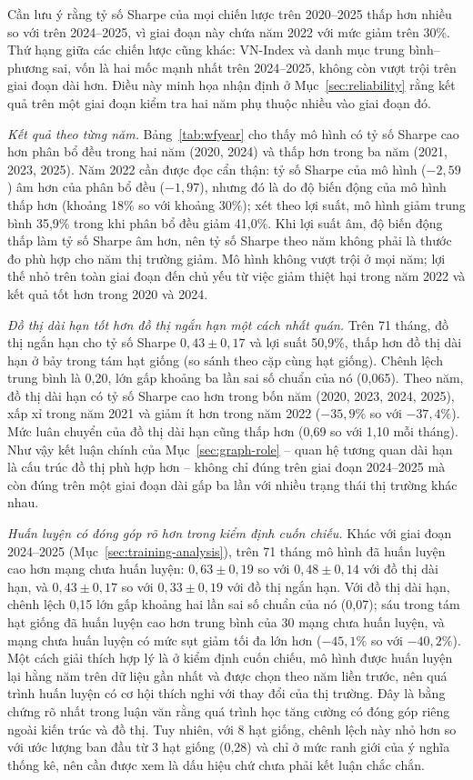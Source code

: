 Cần lưu ý rằng tỷ số Sharpe của mọi chiến lược trên 2020--2025 thấp hơn nhiều so với trên 2024--2025, vì giai đoạn này chứa năm 2022 với mức giảm trên 30\%. Thứ hạng giữa các chiến lược cũng khác: VN-Index và danh mục trung bình--phương sai, vốn là hai mốc mạnh nhất trên 2024--2025, không còn vượt trội trên giai đoạn dài hơn. Điều này minh họa nhận định ở Mục~\ref{sec:reliability} rằng kết quả trên một giai đoạn kiểm tra hai năm phụ thuộc nhiều vào giai đoạn đó.

\textit{Kết quả theo từng năm.} Bảng~\ref{tab:wfyear} cho thấy mô hình có tỷ số Sharpe cao hơn phân bổ đều trong hai năm (2020, 2024) và thấp hơn trong ba năm (2021, 2023, 2025). Năm 2022 cần được đọc cẩn thận: tỷ số Sharpe của mô hình ($-2{,}59$) âm hơn của phân bổ đều ($-1{,}97$), nhưng đó là do độ biến động của mô hình thấp hơn (khoảng 18\% so với khoảng 30\%); xét theo lợi suất, mô hình giảm trung bình 35,9\% trong khi phân bổ đều giảm 41,0\%. Khi lợi suất âm, độ biến động thấp làm tỷ số Sharpe âm hơn, nên tỷ số Sharpe theo năm không phải là thước đo phù hợp cho năm thị trường giảm. Mô hình không vượt trội ở mọi năm; lợi thế nhỏ trên toàn giai đoạn đến chủ yếu từ việc giảm thiệt hại trong năm 2022 và kết quả tốt hơn trong 2020 và 2024.

\textit{Đồ thị dài hạn tốt hơn đồ thị ngắn hạn một cách nhất quán.} Trên 71 tháng, đồ thị ngắn hạn cho tỷ số Sharpe $0{,}43\pm0{,}17$ và lợi suất 50,9\%, thấp hơn đồ thị dài hạn ở bảy trong tám hạt giống (so sánh theo cặp cùng hạt giống). Chênh lệch trung bình là 0,20, lớn gấp khoảng ba lần sai số chuẩn của nó (0,065). Theo năm, đồ thị dài hạn có tỷ số Sharpe cao hơn trong bốn năm (2020, 2023, 2024, 2025), xấp xỉ trong năm 2021 và giảm ít hơn trong năm 2022 ($-35{,}9\%$ so với $-37{,}4\%$). Mức luân chuyển của đồ thị dài hạn cũng thấp hơn (0,69 so với 1,10 mỗi tháng). Như vậy kết luận chính của Mục~\ref{sec:graph-role} -- quan hệ tương quan dài hạn là cấu trúc đồ thị phù hợp hơn -- không chỉ đúng trên giai đoạn 2024--2025 mà còn đúng trên một giai đoạn dài gấp ba lần với nhiều trạng thái thị trường khác nhau.

\textit{Huấn luyện có đóng góp rõ hơn trong kiểm định cuốn chiếu.} Khác với giai đoạn 2024--2025 (Mục~\ref{sec:training-analysis}), trên 71 tháng mô hình đã huấn luyện cao hơn mạng chưa huấn luyện: $0{,}63\pm0{,}19$ so với $0{,}48\pm0{,}14$ với đồ thị dài hạn, và $0{,}43\pm0{,}17$ so với $0{,}33\pm0{,}19$ với đồ thị ngắn hạn. Với đồ thị dài hạn, chênh lệch 0,15 lớn gấp khoảng hai lần sai số chuẩn của nó (0,07); sáu trong tám hạt giống đã huấn luyện cao hơn trung bình của 30 mạng chưa huấn luyện, và mạng chưa huấn luyện có mức sụt giảm tối đa lớn hơn ($-45{,}1\%$ so với $-40{,}2\%$). Một cách giải thích hợp lý là ở kiểm định cuốn chiếu, mô hình được huấn luyện lại hằng năm trên dữ liệu gần nhất và được chọn theo năm liền trước, nên quá trình huấn luyện có cơ hội thích nghi với thay đổi của thị trường. Đây là bằng chứng rõ nhất trong luận văn rằng quá trình học tăng cường có đóng góp riêng ngoài kiến trúc và đồ thị. Tuy nhiên, với 8 hạt giống, chênh lệch này nhỏ hơn so với ước lượng ban đầu từ 3 hạt giống (0,28) và chỉ ở mức ranh giới của ý nghĩa thống kê, nên cần được xem là dấu hiệu chứ chưa phải kết luận chắc chắn.


